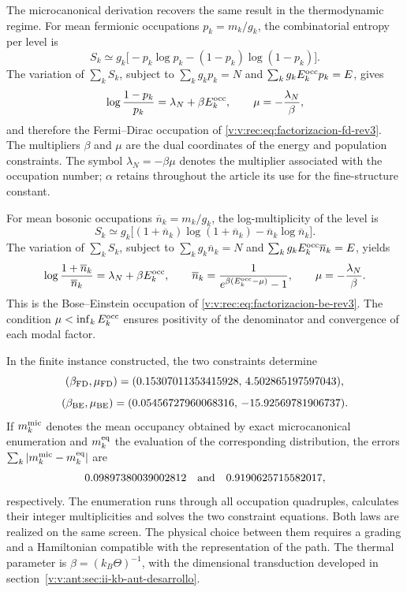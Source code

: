 The microcanonical derivation recovers the same result in the
thermodynamic regime. For mean fermionic occupations
\(p_k=m_k/g_k\), the combinatorial entropy per level is
\begin{equation}
 S_k\simeq
 g_k\bigl[-p_k\log p_k-(1-p_k)\log(1-p_k)\bigr].
 \label{v:v:rec:eq:entropia-fd-nivel-rev3}
\end{equation}
The variation of \(\sum_kS_k\), subject to
\(\sum_kg_kp_k=N\) and
\(\sum_kg_kE_k^{\rm occ}p_k=E\), gives
\begin{equation}
 \log\frac{1-p_k}{p_k}=\lambda_N+\beta E_k^{\rm occ},
 \qquad
 \mu=-\frac{\lambda_N}{\beta},
 \label{v:v:rec:eq:variacion-fd-rev3}
\end{equation}
and therefore the Fermi--Dirac occupation of
\eqref{v:v:rec:eq:factorizacion-fd-rev3}. The multipliers \(\beta\) and \(\mu\)
are the dual coordinates of the energy and population constraints.
The symbol \(\lambda_N=-\beta\mu\) denotes the multiplier associated with the
occupation number; \(\alpha\) retains throughout the article its use
for the fine-structure constant.

For mean bosonic occupations
\(\overline n_k=m_k/g_k\), the log-multiplicity of the level is
\begin{equation}
 S_k\simeq
 g_k\bigl[(1+\overline n_k)\log(1+\overline n_k)
          -\overline n_k\log\overline n_k\bigr].
 \label{v:v:rec:eq:entropia-be-nivel-rev3}
\end{equation}
The variation of \(\sum_kS_k\), subject to
\(\sum_kg_k\overline n_k=N\) and
\(\sum_kg_kE_k^{\rm occ}\overline n_k=E\), yields
\begin{equation}
 \log\frac{1+\overline n_k}{\overline n_k}
 =\lambda_N+\beta E_k^{\rm occ},
 \qquad
 \overline n_k
 =\frac{1}{e^{\beta(E_k^{\rm occ}-\mu)}-1},
 \qquad
 \mu=-\frac{\lambda_N}{\beta}.
 \label{v:v:rec:eq:variacion-be-rev3}
\end{equation}
This is the Bose--Einstein occupation of
\eqref{v:v:rec:eq:factorizacion-be-rev3}. The condition
\(\mu<\inf_kE_k^{\rm occ}\) ensures positivity of the denominator and
convergence of each modal factor.

In the finite instance constructed, the two constraints determine
\[
 (\beta_{\rm FD},\mu_{\rm FD})
 =(0.15307011353415928,\,4.502865197597043),
\]
\[
 (\beta_{\rm BE},\mu_{\rm BE})
 =(0.05456727960068316,\,-15.92569781906737).
\]
If \(m_k^{\rm mic}\) denotes the mean occupancy obtained by exact
microcanonical enumeration and \(m_k^{\rm eq}\) the evaluation of the corresponding
distribution, the errors
\(\sum_k|m_k^{\rm mic}-m_k^{\rm eq}|\) are
\[
 0.09897380039002812\quad\hbox{and}\quad
 0.9190625715582017,
\]
respectively. The enumeration runs through all occupation quadruples,
calculates their integer multiplicities and solves the two constraint
equations. Both laws are realized on the same screen. The physical
choice between them requires a grading and a Hamiltonian compatible with the
representation of the path. The thermal parameter is
\(\beta=(k_B\Theta)^{-1}\), with the dimensional transduction developed in
section~\ref{v:v:ant:sec:ii-kb-aut-desarrollo}.

